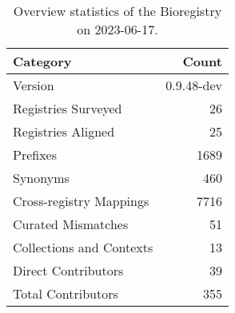 \begin{table}
\caption{Overview statistics of the Bioregistry on 2023-06-17.}
\label{tab:bioregistry-summary}
\begin{tabular}{lr}
\toprule
Category & Count \\
\midrule
Version & 0.9.48-dev \\
Registries Surveyed & 26 \\
Registries Aligned & 25 \\
Prefixes & 1689 \\
Synonyms & 460 \\
Cross-registry Mappings & 7716 \\
Curated Mismatches & 51 \\
Collections and Contexts & 13 \\
Direct Contributors & 39 \\
Total Contributors & 355 \\
\bottomrule
\end{tabular}
\end{table}
